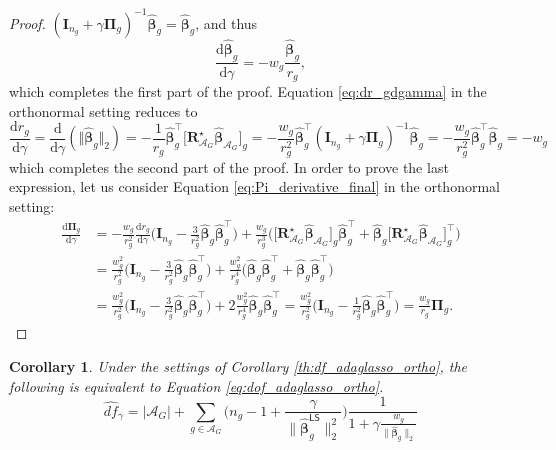 \documentclass[a4paper, 12pt]{article}
\newcommand{\Aset}{\mathcal{A}}
\newcommand{\betahat}{\widehat{\boldsymbol\beta}}
\newcommand{\T}{\top}
\def\bbeta{\boldsymbol{\beta}}
\def\bPi{\boldsymbol{\Pi}}
\def\bI{\mathbf{I}}
\def\bR{\mathbf{R}}
\newtheorem{corollary}{Corollary}
\begin{document}
\begin{proof}
$ (\bI_{n_g} + \gamma\boldsymbol{\Pi}_g)^{-1} \betahat_g =  \betahat_g$,
and thus 
\begin{equation*}
\frac{\mathrm{d}\betahat_g}{\mathrm{d}\gamma} = - w_g  \frac{\betahat_g}{r_g},
\end{equation*}
which completes the first part of the proof. Equation \eqref{eq:dr_gdgamma} in the orthonormal setting reduces to
\begin{equation*}
\frac{\mathrm{d}r_g}{\mathrm{d}\gamma}
= \frac{\mathrm{d}}{\mathrm{d}\gamma} \left( \Vert \widehat{\bbeta}_{g} \Vert_2 \right)
=-\frac{1}{r_g}\widehat{\bbeta}_{g}^{\T} \Big[\bR_{\Aset_G}^\star\betahat_{\Aset_G}\Big]_g = -\frac{w_g}{r^2_g}\widehat{\bbeta}_{g}^{\T} ( \bI_{n_g} + \gamma \bPi_g)^{-1} \betahat_g = -\frac{w_g}{r^2_g}\widehat{\bbeta}_{g}^{\T} \betahat_g = -w_g
\end{equation*}
which completes the second part of the proof. In order to prove the last expression, let us consider Equation \eqref{eq:Pi_derivative_final} in the orthonormal setting:
\begin{align*}
\frac{\mathrm{d}\bPi_{g}}{\mathrm{d}\gamma}
&= -\frac{w_g}{r_g^2}\frac{\mathrm{d}r_g}{\mathrm{d}\gamma}\Big(\bI_{n_g}-\frac{3}{r_g^2} \widehat{\bbeta}_g \widehat{\bbeta}_g^{\T} \Big)+  \frac{w_g}{r_g^3} \Big(\Big[\bR_{\Aset_G}^\star\widehat{\bbeta}_{\Aset_G}\Big]_g \widehat{\bbeta}_g^{\T} + \widehat{\bbeta}_g \Big[\bR_{\Aset_G}^\star\widehat{\bbeta}_{\Aset_G}\Big]_g^{\T} \Big)\\
&= \frac{w_g^2}{r_g^2}\Big(\bI_{n_g}-\frac{3}{r_g^2} \widehat{\bbeta}_g \widehat{\bbeta}_g^{\T} \Big)+ \frac{w_g^2}{r_g^4} \Big(\widehat{\bbeta}_g \widehat{\bbeta}_g^{\T} + \widehat{\bbeta}_g \widehat{\bbeta}_g^{\T}  \Big)\\
&=  \frac{w_g^2}{r_g^2}\Big(\bI_{n_g}-\frac{3}{r_g^2} \widehat{\bbeta}_g \widehat{\bbeta}_g^{\T} \Big)+ 2\frac{w_g^2}{r_g^4} \widehat{\bbeta}_g \widehat{\bbeta}_g^{\T}
=  \frac{w_g^2}{r_g^2}\Big(\bI_{n_g}-\frac{1}{r_g^2} \widehat{\bbeta}_g \widehat{\bbeta}_g^{\T} \Big)= \frac{w_g}{r_g}\bPi_g.
\end{align*}
\end{proof}
%
\begin{corollary}
\label{coro:alternative_adaglasso}
Under the settings of Corollary \ref{th:df_adaglasso_ortho},  the following is equivalent to Equation \eqref{eq:dof_adaglasso_ortho}.
\begin{equation*}
\widehat{df}_\gamma = |\Aset_G| + \sum_{g \in \Aset_G} \bigg(n_g-1+\frac{\gamma}{\lVert\widehat{\bbeta}_g^\mathsf{LS}\rVert_2^2}\bigg) \frac{1}{1+\gamma\frac{w_g}{\lVert \widehat{\bbeta}_g\rVert_2}}
\end{equation*}
\end{corollary}
\end{document}

